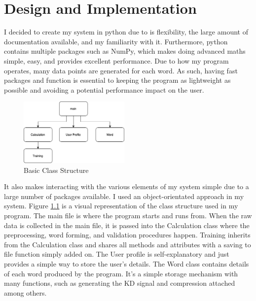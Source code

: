 \documentclass[10pt,a4paper]{report}
\begin{document}
\chapter{Design and Implementation}

I decided to create my system in python due to is flexibility, the large amount of documentation available, and my familiarity with it. Furthermore, python contains multiple packages such as NumPy, which makes doing advanced maths simple, easy, and provides excellent performance. Due to how my program operates, many data points are generated for each word. As such, having fast packages and function is essential to keeping the program as lightweight as possible and avoiding a potential performance impact on the user.

\begin{figure}
	\begin{center}
		\includegraphics[width=0.48\textwidth]{OOP}
	\end{center}
	\caption{Basic Class Structure}
	\label{fig:ClassStruct}
\end{figure}

It also makes interacting with the various elements of my system simple due to a large number of packages available. I used an object-orientated approach in my system. Figure \ref{fig:ClassStruct} is a visual representation of the class structure used in my program. The main file is where the program starts and runs from. When the raw data is collected in the main file, it is passed into the Calculation class where the preprocessing, word forming, and validation procedures happen. Training inherits from the Calculation class and shares all methods and attributes with a saving to file function simply added on. The User profile is self-explanatory and just provides a simple way to store the user's details. The Word class contains details of each word produced by the program. It's a simple storage mechanism with many functions, such as generating the KD signal and compression attached among others.
\end{document}
